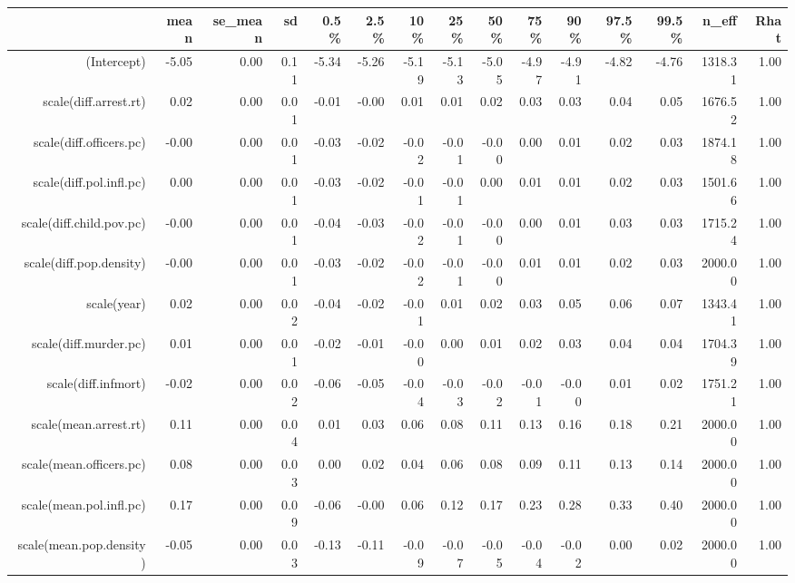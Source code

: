 \begin{table}[ht]
\centering
\begin{tabular}{rrrrrrrrrrrrrrr}
  \hline
 & mean & se\_mean & sd & 0.5\% & 2.5\% & 10\% & 25\% & 50\% & 75\% & 90\% & 97.5\% & 99.5\% & n\_eff & Rhat \\ 
  \hline
(Intercept) & -5.05 & 0.00 & 0.11 & -5.34 & -5.26 & -5.19 & -5.13 & -5.05 & -4.97 & -4.91 & -4.82 & -4.76 & 1318.31 & 1.00 \\ 
  scale(diff.arrest.rt) & 0.02 & 0.00 & 0.01 & -0.01 & -0.00 & 0.01 & 0.01 & 0.02 & 0.03 & 0.03 & 0.04 & 0.05 & 1676.52 & 1.00 \\ 
  scale(diff.officers.pc) & -0.00 & 0.00 & 0.01 & -0.03 & -0.02 & -0.02 & -0.01 & -0.00 & 0.00 & 0.01 & 0.02 & 0.03 & 1874.18 & 1.00 \\ 
  scale(diff.pol.infl.pc) & 0.00 & 0.00 & 0.01 & -0.03 & -0.02 & -0.01 & -0.01 & 0.00 & 0.01 & 0.01 & 0.02 & 0.03 & 1501.66 & 1.00 \\ 
  scale(diff.child.pov.pc) & -0.00 & 0.00 & 0.01 & -0.04 & -0.03 & -0.02 & -0.01 & -0.00 & 0.00 & 0.01 & 0.03 & 0.03 & 1715.24 & 1.00 \\ 
  scale(diff.pop.density) & -0.00 & 0.00 & 0.01 & -0.03 & -0.02 & -0.02 & -0.01 & -0.00 & 0.01 & 0.01 & 0.02 & 0.03 & 2000.00 & 1.00 \\ 
  scale(year) & 0.02 & 0.00 & 0.02 & -0.04 & -0.02 & -0.01 & 0.01 & 0.02 & 0.03 & 0.05 & 0.06 & 0.07 & 1343.41 & 1.00 \\ 
  scale(diff.murder.pc) & 0.01 & 0.00 & 0.01 & -0.02 & -0.01 & -0.00 & 0.00 & 0.01 & 0.02 & 0.03 & 0.04 & 0.04 & 1704.39 & 1.00 \\ 
  scale(diff.infmort) & -0.02 & 0.00 & 0.02 & -0.06 & -0.05 & -0.04 & -0.03 & -0.02 & -0.01 & -0.00 & 0.01 & 0.02 & 1751.21 & 1.00 \\ 
  scale(mean.arrest.rt) & 0.11 & 0.00 & 0.04 & 0.01 & 0.03 & 0.06 & 0.08 & 0.11 & 0.13 & 0.16 & 0.18 & 0.21 & 2000.00 & 1.00 \\ 
  scale(mean.officers.pc) & 0.08 & 0.00 & 0.03 & 0.00 & 0.02 & 0.04 & 0.06 & 0.08 & 0.09 & 0.11 & 0.13 & 0.14 & 2000.00 & 1.00 \\ 
  scale(mean.pol.infl.pc) & 0.17 & 0.00 & 0.09 & -0.06 & -0.00 & 0.06 & 0.12 & 0.17 & 0.23 & 0.28 & 0.33 & 0.40 & 2000.00 & 1.00 \\ 
  scale(mean.pop.density) & -0.05 & 0.00 & 0.03 & -0.13 & -0.11 & -0.09 & -0.07 & -0.05 & -0.04 & -0.02 & 0.00 & 0.02 & 2000.00 & 1.00 \\ 

\end{tabular}
\end{table}
